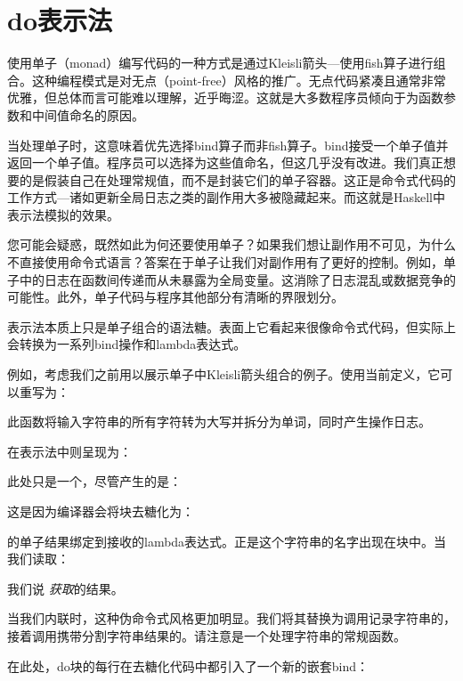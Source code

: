 
\section{do表示法}

使用单子（monad）编写代码的一种方式是通过Kleisli箭头---使用fish算子进行组合。这种编程模式是对无点（point-free）风格的推广。无点代码紧凑且通常非常优雅，但总体而言可能难以理解，近乎晦涩。这就是大多数程序员倾向于为函数参数和中间值命名的原因。

当处理单子时，这意味着优先选择bind算子而非fish算子。bind接受一个单子值并返回一个单子值。程序员可以选择为这些值命名，但这几乎没有改进。我们真正想要的是假装自己在处理常规值，而不是封装它们的单子容器。这正是命令式代码的工作方式---诸如更新全局日志之类的副作用大多被隐藏起来。而这就是Haskell中表示法模拟的效果。

您可能会疑惑，既然如此为何还要使用单子？如果我们想让副作用不可见，为什么不直接使用命令式语言？答案在于单子让我们对副作用有了更好的控制。例如，单子中的日志在函数间传递而从未暴露为全局变量。这消除了日志混乱或数据竞争的可能性。此外，单子代码与程序其他部分有清晰的界限划分。

表示法本质上只是单子组合的语法糖。表面上它看起来很像命令式代码，但实际上会转换为一系列bind操作和lambda表达式。

例如，考虑我们之前用以展示单子中Kleisli箭头组合的例子。使用当前定义，它可以重写为：

此函数将输入字符串的所有字符转为大写并拆分为单词，同时产生操作日志。

在表示法中则呈现为：

此处只是一个，尽管产生的是：

这是因为编译器会将块去糖化为：

的单子结果绑定到接收的lambda表达式。正是这个字符串的名字出现在块中。当我们读取：

我们说 \emph{获取}的结果。

当我们内联时，这种伪命令式风格更加明显。我们将其替换为调用记录字符串的，接着调用携带分割字符串结果的。请注意是一个处理字符串的常规函数。

在此处，do块的每行在去糖化代码中都引入了一个新的嵌套bind：

